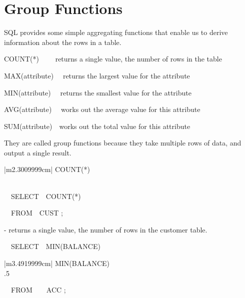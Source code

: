 \section{Group Functions}
SQL provides some simple aggregating functions that enable us to derive information about the rows in a table.

COUNT(*) \ \ \ \ returns a single value, the number of rows in the table

MAX(attribute) \ \ returns the largest value for the attribute

MIN(attribute) \ \ returns the smallest value for the attribute

AVG(attribute) \ \ works out the average value for this attribute

SUM(attribute)\ \ works out the total value for this attribute

They are called {\textquotedbl}group{\textquotedbl} functions because they take multiple rows of data, and output a single result.

\begin{center}
\begin{minipage}{2.501cm}
\begin{center}
\tablefirsthead{}
\tablehead{}
\tabletail{}
\tablelasttail{}
\begin{supertabular}{|m{2.3009999cm}|}
\hline
COUNT(*)\\\\
\end{supertabular}
\end{center}
\end{minipage}
\end{center}
\ \ SELECT\ \ COUNT(*)

\ \  FROM\ \ CUST ;

{}- returns a single value, the number of rows in the customer table.

\ \ SELECT\ \ MIN(BALANCE)

\begin{center}
\begin{minipage}{3.692cm}
\begin{flushleft}
\tablefirsthead{}
\tablehead{}
\tabletail{}
\tablelasttail{}
\begin{supertabular}{|m{3.4919999cm}|}
\hline
MIN(BALANCE)\\\hline
.5\\
\end{supertabular}
\end{flushleft}
\end{minipage}
\end{center}
\ \ FROM\ \ \ \  ACC ;

